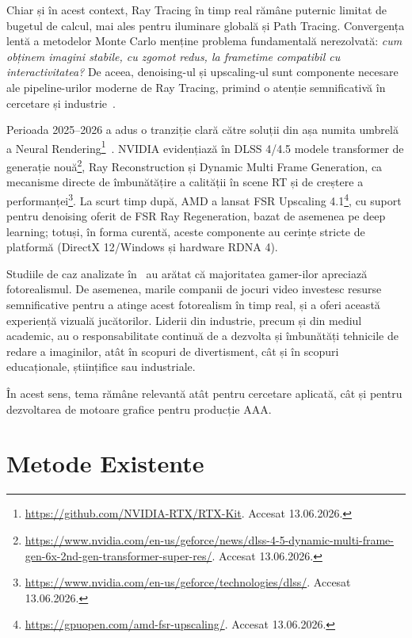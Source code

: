 \documentclass[12pt,a4paper]{report}
\numberwithin{equation}{section} %
\begin{document}
Chiar și în acest context, Ray Tracing în timp real rămâne puternic limitat de bugetul de calcul, mai ales pentru iluminare globală și Path Tracing.
Convergența lentă a metodelor Monte Carlo menține problema fundamentală nerezolvată: \textit{cum obținem imagini stabile, cu zgomot redus, la frametime compatibil cu interactivitatea?}
De aceea, denoising-ul și upscaling-ul sunt componente necesare ale pipeline-urilor moderne de Ray Tracing, primind o atenție semnificativă în cercetare și industrie~\cite{JIANG2025103013}.

Perioada 2025--2026 a adus o tranziție clară către soluții din așa numita umbrelă a Neural Rendering\footnote{\url{https://github.com/NVIDIA-RTX/RTX-Kit}. Accesat 13.06.2026.}~\cite{tewari2020stateartneuralrendering}.
NVIDIA evidențiază în DLSS 4/4.5 modele transformer de generație nouă\footnote{\url{https://www.nvidia.com/en-us/geforce/news/dlss-4-5-dynamic-multi-frame-gen-6x-2nd-gen-transformer-super-res/}. Accesat 13.06.2026.}, Ray Reconstruction și Dynamic Multi Frame Generation, ca mecanisme directe de îmbunătățire a calității în scene RT și de creștere a performanței\footnote{\url{https://www.nvidia.com/en-us/geforce/technologies/dlss/}. Accesat 13.06.2026.}.
La scurt timp după, AMD a lansat FSR Upscaling 4.1\footnote{\url{https://gpuopen.com/amd-fsr-upscaling/}. Accesat 13.06.2026.}, cu suport pentru denoising oferit de FSR Ray Regeneration, bazat de asemenea pe deep learning; totuși, în forma curentă, aceste componente au cerințe stricte de platformă (DirectX 12/Windows și hardware RDNA 4).

Studiile de caz analizate în~\cite{DieXaR2024} au arătat că majoritatea gamer-ilor apreciază fotorealismul.
De asemenea, marile companii de jocuri video investesc resurse semnificative pentru a atinge acest fotorealism în timp real, și a oferi această experiență vizuală jucătorilor.
Liderii din industrie, precum și din mediul academic, au o responsabilitate continuă de a dezvolta și îmbunătăți tehnicile de redare a imaginilor, atât în scopuri de divertisment, cât și în scopuri educaționale, științifice sau industriale.

În acest sens, tema rămâne relevantă atât pentru cercetare aplicată, cât și pentru dezvoltarea de motoare grafice pentru producție AAA.


\chapter{\label{sec:stateoftheart}Metode Existente}
\end{document}
